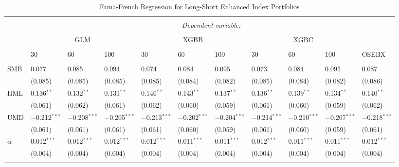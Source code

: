\begin{table}[H]  
  \caption{Fama-French Regression for Long-Short Enhanced Index Portfolios} 
  \label{table:FAMA-FRENCH-LONG-SHORT-ENHANCED-FINAL} 
\begin{tabularx}{\textwidth}{XXXXXXXXXXl} 
\\[-2ex]\hline 
\hline \\[-2ex] 
 & \multicolumn{10}{c}{\textit{Dependent variable:}} \\ 
\cline{2-11} 
\\[-2ex] 
 & \multicolumn{3}{c}{GLM} & \multicolumn{3}{c}{XGBB} & \multicolumn{3}{c}{XGBC} & \\
 \cline{2-11}
 \\[-2ex] 
 & 30 & 60 & 100 & 30 & 60 & 100 & 30 & 60 & 100 & OSEBX \\ 
 \cline{2-11} \\
 SMB & 0.077 & 0.085 & 0.094 & 0.074 & 0.084 & 0.095 & 0.073 & 0.084 & 0.095 & 0.087 \\ 
  & (0.085) & (0.085) & (0.085) & (0.085) & (0.084) & (0.082) & (0.085) & (0.084) & (0.082) & (0.086) \\ 
 HML & 0.136$^{**}$ & 0.132$^{**}$ & 0.131$^{**}$ & 0.146$^{**}$ & 0.143$^{**}$ & 0.137$^{**}$ & 0.136$^{**}$ & 0.139$^{**}$ & 0.134$^{**}$ & 0.140$^{**}$ \\ 
  & (0.061) & (0.062) & (0.061) & (0.062) & (0.060) & (0.059) & (0.061) & (0.060) & (0.059) & (0.062) \\ 
 UMD & $-$0.212$^{***}$ & $-$0.208$^{***}$ & $-$0.205$^{***}$ & $-$0.213$^{***}$ & $-$0.202$^{***}$ & $-$0.204$^{***}$ & $-$0.214$^{***}$ & $-$0.210$^{***}$ & $-$0.207$^{***}$ & $-$0.218$^{***}$ \\ 
  & (0.061) & (0.061) & (0.061) & (0.061) & (0.060) & (0.059) & (0.061) & (0.060) & (0.059) & (0.061) \\ 
 $\alpha$ & 0.012$^{***}$ & 0.012$^{***}$ & 0.012$^{***}$ & 0.012$^{***}$ & 0.011$^{***}$ & 0.011$^{***}$ & 0.012$^{***}$ & 0.011$^{***}$ & 0.011$^{***}$ & 0.012$^{***}$ \\ 
  & (0.004) & (0.004) & (0.004) & (0.004) & (0.004) & (0.004) & (0.004) & (0.004) & (0.004) & (0.004) \\ 
\hline \\[-2ex] 

\end{tabularx}
\end{table}
